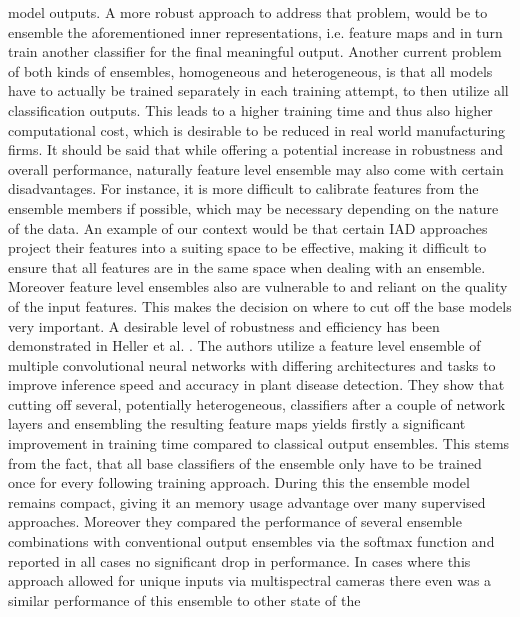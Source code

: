 model outputs. A more robust approach to address that problem, would be to ensemble the aforementioned inner representations, i.e. feature maps 
and in turn train another classifier for the final meaningful output.
\newline
Another current problem of both kinds of ensembles, homogeneous and heterogeneous, is that all models have to actually be trained 
separately in each training attempt, to then utilize all classification outputs. This leads to a higher training time and thus also higher computational 
cost, which is desirable to be reduced in real world manufacturing firms.
It should be said that while offering a potential increase in robustness and overall performance, naturally feature level ensemble may also 
come with certain disadvantages. For instance, it is more difficult to calibrate features from the ensemble members if possible, which may 
be necessary depending on the nature of the data. An example of our context would be that certain IAD approaches project their features into a 
suiting space to be effective, making it difficult to ensure that all features are in the same space when dealing with an ensemble. 
Moreover feature level ensembles also are vulnerable to and reliant on the quality of the input features. This makes the decision on where 
to cut off the base models very important.
\newline
A desirable level of robustness and efficiency has been demonstrated in Heller et al. \cite{EnsembleHeller2023}. The authors utilize a feature level ensemble of multiple 
convolutional neural networks with differing architectures and tasks to improve inference speed and accuracy in plant disease detection.
They show that cutting off several, potentially heterogeneous, classifiers after a couple of network layers and ensembling the 
resulting feature maps yields firstly a significant improvement in training time compared to classical output ensembles. This stems from 
the fact, that all base classifiers of the ensemble only have to be trained once for every following training approach. During this the ensemble 
model remains compact, giving it an memory usage advantage over many supervised approaches. 
Moreover they compared the performance of several ensemble combinations with conventional 
output ensembles via the softmax function and reported in all cases no significant drop in performance. In cases where this approach allowed for 
unique inputs via multispectral cameras \cite{EnsembleHeller2023} there even was a similar performance of this ensemble to other state of the 
